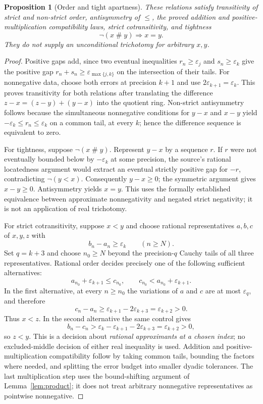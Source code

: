 \documentclass[11pt,reqno]{amsart}
\newtheorem{proposition}[theorem]{Proposition}
\theoremstyle{definition}\newtheorem{definition}[theorem]{Definition}
\theoremstyle{remark}\newtheorem{remark}[theorem]{Remark}
\newcommand{\eps}{\varepsilon}
\newcommand{\Apt}{\mathrel{\#}}
\begin{document}
\begin{proposition}[Order and tight apartness]\label{prop:apart}
These relations satisfy transitivity of strict and non-strict order, antisymmetry of $\le$, the proved addition and positive-multiplication compatibility laws, strict cotransitivity, and tightness
\[
\neg(x\Apt y)\Longrightarrow x=y.
\]
They do not supply an unconditional trichotomy for arbitrary $x,y$.
\end{proposition}
\begin{proof}
Positive gaps add, since two eventual inequalities $r_n\ge\eps_j$ and $s_n\ge\eps_k$ give the positive gap $r_n+s_n\ge\eps_{\max\{j,k\}}$ on the intersection of their tails. For nonnegative data, choose both errors at precision $k+1$ and use $2\eps_{k+1}=\eps_k$. This proves transitivity for both relations after translating the difference $z-x=(z-y)+(y-x)$ into the quotient ring. Non-strict antisymmetry follows because the simultaneous nonnegative conditions for $y-x$ and $x-y$ yield $-\eps_k\le r_n\le\eps_k$ on a common tail, at every $k$; hence the difference sequence is equivalent to zero.

For tightness, suppose $\neg(x\Apt y)$. Represent $y-x$ by a sequence $r$. If $r$ were not eventually bounded below by $-\eps_k$ at some precision, the source's rational locatedness argument would extract an eventual strictly positive gap for $-r$, contradicting $\neg(y<x)$. Consequently $y-x\ge0$; the symmetric argument gives $x-y\ge0$. Antisymmetry yields $x=y$. This uses the formally established equivalence between approximate nonnegativity and negated strict negativity; it is not an application of real trichotomy.

For strict cotransitivity, suppose $x<y$ and choose rational representatives $a,b,c$ of $x,y,z$ with
\[
 b_n-a_n\ge\eps_k\qquad(n\ge N).
\]
Set $q=k+3$ and choose $n_0\ge N$ beyond the precision-$q$ Cauchy tails of all three representatives. Rational order decides precisely one of the following sufficient alternatives:
\[
 a_{n_0}+\eps_{k+1}\le c_{n_0},\qquad
 c_{n_0}<a_{n_0}+\eps_{k+1}.
\]
In the first alternative, at every $n\ge n_0$ the variations of $a$ and $c$ are at most $\eps_q$, and therefore
\[
 c_n-a_n\ge \eps_{k+1}-2\eps_{k+3}=\eps_{k+2}>0.
\]
Thus $x<z$. In the second alternative the same control gives
\[
 b_n-c_n>\eps_k-\eps_{k+1}-2\eps_{k+3}
 =\eps_{k+2}>0,
\]
so $z<y$. This is a decision about \emph{rational approximants at a chosen index}; no excluded-middle decision of either real inequality is used. Addition and positive-multiplication compatibility follow by taking common tails, bounding the factors where needed, and splitting the error budget into smaller dyadic tolerances. The last multiplication step uses the bound-shifting argument of Lemma~\ref{lem:product}; it does not treat arbitrary nonnegative representatives as pointwise nonnegative.
\end{proof}
\end{document}
